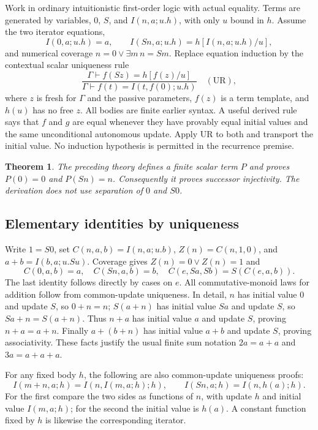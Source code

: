 \documentclass[11pt]{article}
\newtheorem{theorem}{Theorem}[section]
\theoremstyle{definition}\newtheorem{definition}[theorem]{Definition}
\begin{document}
Work in ordinary intuitionistic first-order logic with actual equality.
Terms are generated by variables, $0$, $S$, and
$I(n,a;u.h)$, with only $u$ bound in $h$.  Assume the two iterator equations,
\[
 I(0,a;u.h)=a,\qquad I(Sn,a;u.h)=h[I(n,a;u.h)/u],
\]
and numerical coverage $n=0\lor\exists m\,n=Sm$.
Replace equation induction by the contextual scalar uniqueness rule
\[
 \frac{\Gamma\vdash f(Sz)=h[f(z)/u]}
 {\Gamma\vdash f(t)=I(t,f(0);u.h)}\quad(\mathrm{UR}),
\]
where $z$ is fresh for $\Gamma$ and the passive parameters, $f(z)$ is a
term template, and $h(u)$ has no free $z$.  All bodies are finite earlier
syntax.  A useful derived rule says that $f$ and $g$ are equal whenever
they have provably equal initial values and the same unconditional
autonomous update.  Apply UR to both and transport the initial value.
No induction hypothesis is permitted in the recurrence premise.

\begin{theorem}
The preceding theory defines a finite scalar term $P$ and proves
$P(0)=0$ and $P(Sn)=n$.  Consequently it proves successor injectivity.
The derivation does not use separation of $0$ and $S0$.
\end{theorem}

\subsection{Elementary identities by uniqueness}
Write $1=S0$, set $C(n,a,b)=I(n,a;u.b)$, $Z(n)=C(n,1,0)$, and
$a+b=I(b,a;u.Su)$.  Coverage gives $Z(n)=0\lor Z(n)=1$ and
\[
 C(0,a,b)=a,\quad C(Sn,a,b)=b,\quad
 C(e,Sa,Sb)=S(C(e,a,b)).
\]
The last identity follows directly by cases on $e$.
All commutative-monoid laws for addition follow from common-update
uniqueness.  In detail, $n$ has initial value $0$ and update $S$, so
$0+n=n$; $S(a+n)$ has initial value $Sa$ and update $S$, so
$Sa+n=S(a+n)$.  Thus $n+a$ has initial value $a$ and update $S$,
proving $n+a=a+n$.  Finally $a+(b+n)$ has initial value $a+b$ and
update $S$, proving associativity.  These facts justify the usual finite
sum notation $2a=a+a$ and $3a=a+a+a$.

For any fixed body $h$, the following are also common-update
uniqueness proofs:
\[
 I(m+n,a;h)=I(n,I(m,a;h);h),\qquad
 I(Sn,a;h)=I(n,h(a);h).
\]
For the first compare the two sides as functions of $n$, with update $h$
and initial value $I(m,a;h)$; for the second the initial value is $h(a)$.
A constant function fixed by $h$ is likewise the corresponding iterator.
\end{document}
